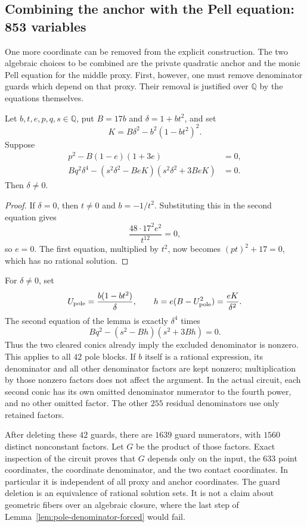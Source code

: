 \subsection{Combining the anchor with the Pell equation: 853 variables}
\label{subsec:explicit-853}

One more coordinate can be removed from the explicit construction. The
two algebraic choices to be combined are the private quadratic anchor
and the monic Pell equation for the middle proxy. First, however, one
must remove denominator guards which depend on that proxy. Their removal
is justified over $\mathbb Q$ by the equations themselves.

\begin{lemma}\label{lem:pole-denominator-forced}
Let $b,t,e,p,q,s\in\mathbb Q$, put $B=17b$ and $\delta=1+bt^2$, and set
\[
 K=B\delta^2-b^2(1-bt^2)^2.
\]
Suppose
\begin{align*}
 p^2-B(1-e)(1+3e)&=0,\\
 Bq^2\delta^4-(s^2\delta^2-BeK)(s^2\delta^2+3BeK)&=0.
\end{align*}
Then $\delta\ne0$.
\end{lemma}
\begin{proof}
If $\delta=0$, then $t\ne0$ and $b=-1/t^2$. Substituting this in
the second equation gives
\[
 \frac{48\cdot17^2e^2}{t^{12}}=0,
\]
so $e=0$. The first equation, multiplied by $t^2$, now becomes
$(pt)^2+17=0$, which has no rational solution.
\end{proof}

For $\delta\ne0$, set
\[
 U_{\rm pole}=\frac{b(1-bt^2)}\delta,
 \qquad h=e(B-U_{\rm pole}^2)=\frac{eK}{\delta^2}.
\]
The second equation of the lemma is exactly $\delta^4$ times
\[
 Bq^2-(s^2-Bh)(s^2+3Bh)=0.
\]
Thus the two cleared conics already imply the excluded denominator is
nonzero. This applies to all $42$ pole blocks. If $b$ itself is a rational
expression, its denominator and all other denominator factors are kept
nonzero; multiplication by those nonzero factors does not affect the
argument. In the actual circuit, each second conic has its own omitted
denominator numerator to the fourth power, and no other omitted factor.
The other $255$ residual denominators use only retained factors.

After deleting these $42$ guards, there are $1639$ guard numerators,
with $1560$ distinct nonconstant factors. Let $G$ be the product of
those factors. Exact inspection of the circuit proves that $G$ depends
only on the input, the $633$ point coordinates, the coordinate
denominator, and the two contact coordinates. In particular it is
independent of all proxy and anchor coordinates. The guard deletion is
an equivalence of rational solution sets. It is not a claim about
geometric fibers over an algebraic closure, where the last step of
Lemma~\ref{lem:pole-denominator-forced} would fail.


